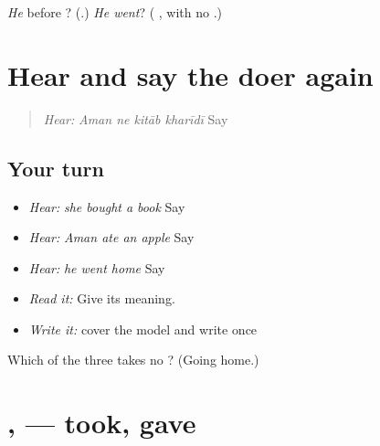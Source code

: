 \begin{tcolorbox}[breakable,colback=teal!4,colframe=teal!35!black,title={Before you move on}]
\emph{He} before \textbf{}? (\textbf{}.) \emph{He went}? (\textbf{ }, with no \textbf{}.)
\end{tcolorbox}
\section[\texorpdfstring{\pa{ਅਮਨ} \pa{ਨੇ} · \pa{ਉਸ} \pa{ਨੇ} (Aman ne · us ne)}{ਅਮਨ ਨੇ · ਉਸ ਨੇ (Aman ne · us ne)}]{Hear and say the doer again}

\label{lesson:PA-C220-ne-review}



\begin{quote}
\emph{Hear:} \emph{Aman ne kitāb kharīdī} Say \textbf{   }
\end{quote}

\subsection*{Your turn}
\begin{itemize}
\raggedright
  \item \emph{Hear:} \emph{she bought a book} Say \textbf{   }
  \item \emph{Hear:} \emph{Aman ate an apple} Say \textbf{   }
  \item \emph{Hear:} \emph{he went home} Say \textbf{  }
  \item \emph{Read it:} \textbf{   } Give its meaning.
  \item \emph{Write it:} cover the model and write \textbf{   } once
\end{itemize}

\begin{tcolorbox}[breakable,colback=teal!4,colframe=teal!35!black,title={Before you move on}]
Which of the three takes no \textbf{}? (Going home.)
\end{tcolorbox}
\section[\texorpdfstring{\pa{ਲਿਆ} · \pa{ਦਿੱਤਾ} (liā · dittā)}{ਲਿਆ · ਦਿੱਤਾ (liā · dittā)}]{,  — took, gave}

